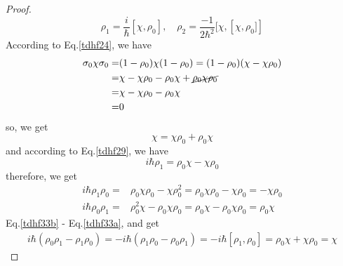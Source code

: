 \begin{proof}
    \begin{equation}
      \rho_1 = \frac{i}{\hbar}[\chi, \rho_0], \quad \rho_2=\frac{-1}{2\hbar^2} [ \chi,\left[ \chi,\rho_0] \right] \label{tdhf29}
    \end{equation}
    According to Eq.\eqref{tdhf24}, we have
    \begin{equation}
      \begin{aligned}
        \sigma_0\chi\sigma_0 =& (1-\rho_0)\chi(1-\rho_0) = (1-\rho_0)(\chi-\chi\rho_0)\\      \label{tdhf30}
                             =& \chi - \chi\rho_0 - \rho_0\chi + \cancel{\rho_0\chi\rho_0}\\
                             =& \chi - \chi\rho_0 - \rho_0\chi \\
                             =& 0                                       
      \end{aligned}
    \end{equation}
    so, we get
    \begin{equation}
      \chi = \chi\rho_0 + \rho_0\chi    \label{tdhf31}
    \end{equation}
    and according to Eq.\eqref{tdhf29}, we have
    \begin{equation}
      i\hbar\rho_1 = \rho_0\chi - \chi\rho_0    \label{tdhf32}
    \end{equation}
    therefore, we get
    \begin{subequations}
      \begin{align}
        i\hbar\rho_1\rho_0 =& \rho_0\chi\rho_0 - \chi\rho_0^2 =  \rho_0\chi\rho_0 - \chi\rho_0 = - \chi\rho_0     \label{tdhf33a}\\
        i\hbar\rho_0\rho_1 =& \rho_0^2\chi - \rho_0\chi\rho_0 =  \rho_0\chi - \rho_0\chi\rho_0 = \rho_0\chi       \label{tdhf33b}
      \end{align}
    \end{subequations}
    Eq.\eqref{tdhf33b} - Eq.\eqref{tdhf33a}, and get
    \begin{equation}
      \begin{aligned}
        i\hbar(\rho_0\rho_1 - \rho_1\rho_0) = -i\hbar(\rho_1\rho_0 - \rho_0\rho_1) = -i\hbar[\rho_1, \rho_0] = \rho_0\chi + \chi\rho_0 = \chi   \label{tdhf34}
      \end{aligned}
    \end{equation}
  \end{proof}
  
